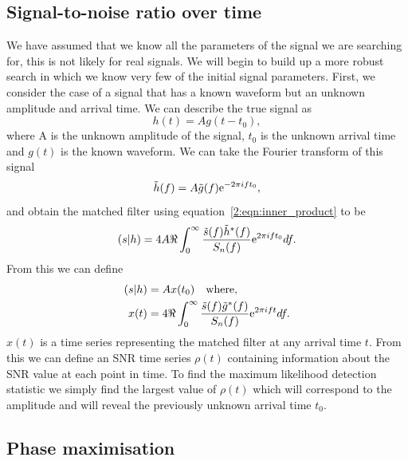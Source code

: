 \subsection{\label{2:sec:snr_timeseries}Signal-to-noise ratio over time}

We have assumed that we know all the parameters of the signal we are searching for, this is not likely for real \gwadj signals. We will begin to build up a more robust search in which we know very few of the initial \gwadj signal parameters. First, we consider the case of a signal that has a known waveform but an unknown amplitude and arrival time. We can describe the true signal as
%
\begin{equation}
    h(t) = A g(t - t_{0}),
\end{equation}
%
where A is the unknown amplitude of the signal, $t_{0}$ is the unknown arrival time and $g(t)$ is the known waveform. We can take the Fourier transform of this signal
%
\begin{equation}
    \tilde{h}(f) = A \tilde{g}(f) {\rm e}^{-2\pi i f t_{0}},
\end{equation}
%
and obtain the matched filter using equation~\ref{2:eqn:inner_product} to be
%
\begin{equation}
    (s|h) = 4 A \Re \int^{\infty}_{0} \frac{\tilde{s}(f) \tilde{h}^*(f)}{S_n(f)} {\rm e}^{2\pi i f t_{0}} df.
\end{equation}
%
From this we can define
%
\begin{align}
    (s|h) &= A x(t_{0}) \quad \text{where}, \\
    x(t) &= 4 \Re \int^{\infty}_{0} \frac{\tilde{s}(f) \tilde{g}^*(f)}{S_n(f)} {\rm e}^{2\pi i f t} df.
\end{align}
%
$x(t)$ is a time series representing the matched filter at any arrival time $t$. From this we can define an SNR time series $\rho(t)$ containing information about the SNR value at each point in time. To find the maximum likelihood detection statistic we simply find the largest value of $\rho(t)$ which will correspond to the amplitude and will reveal the previously unknown arrival time $t_{0}$.

\subsection{\label{2:sec:phase-maximisation}Phase maximisation}

